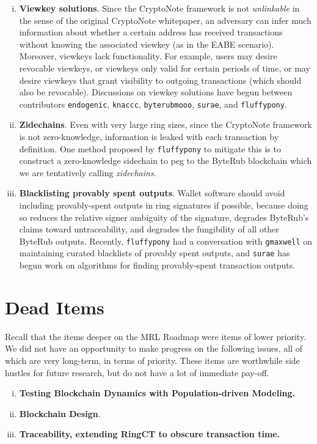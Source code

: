 \documentclass[12pt,english]{mrl}
\theoremstyle{definition}
\numberwithin{equation}{section}
\numberwithin{figure}{section}
\numberwithin{equation}{section}
\numberwithin{equation}{section}
\numberwithin{figure}{section}
\begin{document}
\begin{enumerate}[i.]
\item \textbf{Viewkey solutions}. Since the CryptoNote framework is not \emph{unlinkable} in the sense of the original CryptoNote whitepaper, an adversary can infer much information about whether a certain address has received transactions without knowing the associated viewkey (as in the EABE scenario). Moreover, viewkeys lack functionality. For example, users may desire revocable viewkeys, or viewkeys only valid for certain periods of time, or may desire viewkeys that grant visibility to outgoing transactions (which should also be revocable). Discussions on viewkey solutions have begun between contributors \texttt{endogenic}, \texttt{knaccc}, \texttt{byterubmooo}, \texttt{surae}, and  \texttt{fluffypony}.

\item \textbf{Zidechains}. Even with very large ring sizes, since the CryptoNote framework is not zero-knowledge, information is leaked with each transaction by definition. One method proposed by \texttt{fluffypony} to mitigate this is to construct a zero-knowledge sidechain to peg to the ByteRub blockchain which we are tentatively calling \textit{zidechains}.

\item \textbf{Blacklisting provably spent outputs}. Wallet software should avoid including provably-spent outputs in ring signatures if possible, because doing so reduces the relative signer ambiguity of the signature, degrades ByteRub's claims toward untraceability, and degrades the fungibility of all other ByteRub outputs. Recently, \texttt{fluffypony} had a conversation with \texttt{gmaxwell} on maintaining curated blacklists of provably spent outputs, and \texttt{surae} has begun work on algorithms for finding provably-spent transaction outputs.
\end{enumerate}


\section{Dead Items}

Recall that the items deeper on the MRL Roadmap were items of lower priority. We did not have an opportunity to make progress on the following issues, all of which are very long-term, in terms of priority. These items are worthwhile side hustles for future research, but do not have a lot of immediate pay-off.

\begin{enumerate}[i.]
    \item \textbf{Testing Blockchain Dynamics with Population-driven Modeling.} 
    
    \item \textbf{Blockchain Design}.
    
    \item \textbf{Traceability, extending RingCT to obscure transaction time.}
\end{enumerate}
\end{document}
